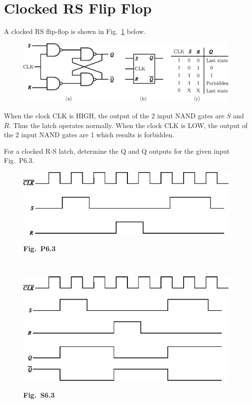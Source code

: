 \section{Clocked RS Flip Flop}\label{sec6.5}
A clocked RS flip-flop is shown in Fig.~\ref{fig6.5} below.
\begin{figure}[H]
\centering
\includegraphics{chap6/fig6.5.eps}
\caption{}\label{fig6.5}
\end{figure}


When the clock CLK is HIGH, the output of the 2 input NAND gates are
$\overline{S}$ and $\overline{R}$. Thus the latch operates normally. When the
clock CLK is LOW, the output of the 2 input NAND gates are 1 which
results is forbidden.

\eject

\begin{problem}\label{prob6.3}
For a clocked R-S latch, determine the Q and Q outputs for the given
input Fig.~P6.3.
\begin{figure}[H]
\centering
\includegraphics{chap6/figP6.5.eps}

\medskip
{\bf Fig.~P6.3}
\end{figure}
\end{problem}

\begin{solution}
~
\begin{figure}[H]
\centering
\includegraphics{chap6/figA6.5.eps}

\medskip
{\bf Fig.~S6.3}
\end{figure}
\end{solution}

\label{6end}
